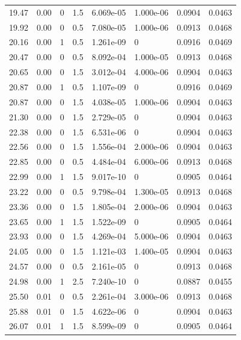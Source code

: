 \documentclass[preview]{standalone}
\begin{document}
{{{\begin{tabular}{L{1.2cm}C{1.2cm} C{0.3cm}C{0.5cm} C{1.4cm}C{1.4cm} C{1.4cm}C{1.4cm}}
  19.47  &  0.00  & 0     & 1.5 &  6.069e-05  & 1.000e-06  & 0.0904 &  0.0463   \\ 
  19.92  &  0.00  & 0     & 0.5 &  7.080e-05  & 1.000e-06  & 0.0913 &  0.0468   \\ 
  20.16  &  0.00  & 1     & 0.5 &  1.261e-09  & 0  & 0.0916 &  0.0469   \\ 
  20.47  &  0.00  & 0     & 0.5 &  8.092e-04  & 1.000e-05  & 0.0913 &  0.0468   \\ 
  20.65  &  0.00  & 0     & 1.5 &  3.012e-04  & 4.000e-06  & 0.0904 &  0.0463   \\ 
  20.87  &  0.00  & 1     & 0.5 &  1.107e-09  & 0  & 0.0916 &  0.0469   \\ 
  20.87  &  0.00  & 0     & 1.5 &  4.038e-05  & 1.000e-06  & 0.0904 &  0.0463   \\ 
  21.30  &  0.00  & 0     & 1.5 &  2.729e-05  & 0  & 0.0904 &  0.0463   \\ 
  22.38  &  0.00  & 0     & 1.5 &  6.531e-06  & 0  & 0.0904 &  0.0463   \\ 
  22.56  &  0.00  & 0     & 1.5 &  1.556e-04  & 2.000e-06  & 0.0904 &  0.0463   \\ 
  22.85  &  0.00  & 0     & 0.5 &  4.484e-04  & 6.000e-06  & 0.0913 &  0.0468   \\ 
  22.99  &  0.00  & 1     & 1.5 &  9.017e-10  & 0  & 0.0905 &  0.0464   \\ 
  23.22  &  0.00  & 0     & 0.5 &  9.798e-04  & 1.300e-05  & 0.0913 &  0.0468   \\ 
  23.36  &  0.00  & 0     & 1.5 &  1.805e-04  & 2.000e-06  & 0.0904 &  0.0463   \\ 
  23.65  &  0.00  & 1     & 1.5 &  1.522e-09  & 0  & 0.0905 &  0.0464   \\ 
  23.93  &  0.00  & 0     & 1.5 &  4.269e-04  & 5.000e-06  & 0.0904 &  0.0463   \\ 
  24.05  &  0.00  & 0     & 1.5 &  1.121e-03  & 1.400e-05  & 0.0904 &  0.0463   \\ 
  24.57  &  0.00  & 0     & 0.5 &  2.161e-05  & 0  & 0.0913 &  0.0468   \\ 
  24.98  &  0.00  & 1     & 2.5 &  7.240e-10  & 0  & 0.0887 &  0.0455   \\ 
  25.50  &  0.01  & 0     & 0.5 &  2.261e-04  & 3.000e-06  & 0.0913 &  0.0468   \\ 
  25.88  &  0.01  & 0     & 1.5 &  4.622e-06  & 0  & 0.0904 &  0.0463   \\ 
  26.07  &  0.01  & 1     & 1.5 &  8.599e-09  & 0  & 0.0905 &  0.0464   \\ 

\end{tabular}}}}
\end{document}
